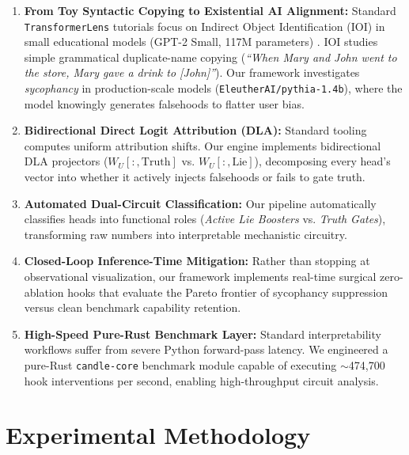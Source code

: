\documentclass[journal,10pt,twocolumn]{IEEEtran}
\begin{document}
\begin{enumerate}
    \item \textbf{From Toy Syntactic Copying to Existential AI Alignment:} Standard \texttt{TransformerLens} tutorials focus on Indirect Object Identification (IOI) in small educational models (GPT-2 Small, 117M parameters) \cite{wang2022interpretability}. IOI studies simple grammatical duplicate-name copying (\textit{``When Mary and John went to the store, Mary gave a drink to [John]''}). Our framework investigates \textit{sycophancy} in production-scale models (\texttt{EleutherAI/pythia-1.4b}), where the model knowingly generates falsehoods to flatter user bias.
    \item \textbf{Bidirectional Direct Logit Attribution (DLA):} Standard tooling computes uniform attribution shifts. Our engine implements bidirectional DLA projectors ($W_U[:, \text{Truth}]$ vs. $W_U[:, \text{Lie}]$), decomposing every head's vector into whether it actively injects falsehoods or fails to gate truth.
    \item \textbf{Automated Dual-Circuit Classification:} Our pipeline automatically classifies heads into functional roles (\textit{Active Lie Boosters} vs. \textit{Truth Gates}), transforming raw numbers into interpretable mechanistic circuitry.
    \item \textbf{Closed-Loop Inference-Time Mitigation:} Rather than stopping at observational visualization, our framework implements real-time surgical zero-ablation hooks that evaluate the Pareto frontier of sycophancy suppression versus clean benchmark capability retention.
    \item \textbf{High-Speed Pure-Rust Benchmark Layer:} Standard interpretability workflows suffer from severe Python forward-pass latency. We engineered a pure-Rust \texttt{candle-core} benchmark module capable of executing $\sim$474,700 hook interventions per second, enabling high-throughput circuit analysis.
\end{enumerate}

\section{Experimental Methodology}
\label{sec:methodology}
\end{document}
